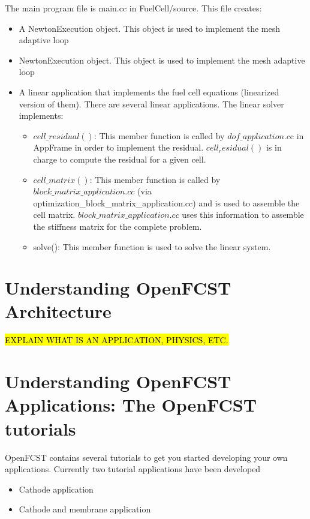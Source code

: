 The main program file is main.cc in FuelCell/source. This file creates:
\begin{itemize}
 \item A NewtonExecution object. This object is used to implement the mesh adaptive loop
 \item NewtonExecution object. This object is used to implement the mesh adaptive loop
 \item A linear application that implements the fuel cell equations (linearized version of them). There are several linear applications. The linear solver implements:
	\begin{itemize}
 	\item $cell\_residual()$: This member function is called by $dof\_application.c$c in AppFrame in order to
implement the residual. $cell_residual()$ is in charge to compute the residual for a given cell.
 	\item $cell\_matrix()$: This member function is called by $block\_matrix\_application.cc$ (via
optimization\_block\_matrix\_application.cc) and is used to assemble the cell matrix. $block\_matrix\_application.cc$
uses this information to assemble the stiffness matrix for the complete problem.
 	\item solve(): This member function is used to solve the linear system.
	\end{itemize}
\end{itemize}

\section{Understanding OpenFCST Architecture}

\hl{EXPLAIN WHAT IS AN APPLICATION, PHYSICS, ETC.}

\section{Understanding OpenFCST Applications: The OpenFCST tutorials}

OpenFCST contains several tutorials to get you started developing your own applications. Currently two tutorial applications have been developed
\begin{itemize}
 \item Cathode application
 \item Cathode and membrane application
\end{itemize}

